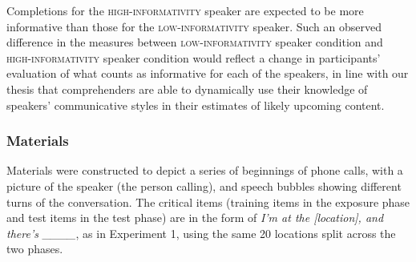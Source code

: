 \documentclass[output=paper,colorlinks,citecolor=brown]{langscibook}
\begin{document}
Completions for the \textsc{high-informativity} speaker are expected to be more informative than those for the \textsc{low-informativity} speaker. Such an observed difference in the measures between \textsc{low-informativity} speaker condition and \textsc{high-informativity} speaker condition would reflect a change in participants’ evaluation of what counts as informative for each of the speakers, in line with our thesis that comprehenders are able to dynamically use their knowledge of speakers’ communicative styles in their estimates of likely upcoming content.

\subsubsection{Materials}

Materials were constructed to depict a series of beginnings of phone calls, with a picture of the speaker (the person calling), and speech bubbles showing different turns of the conversation. The critical items (training items in the exposure phase and test items in the test phase) are in the form of \textit{I’m at the [location], and there’s \_\_\_\_}, as in Experiment 1, using the same 20 locations split across the two phases.
\end{document}
